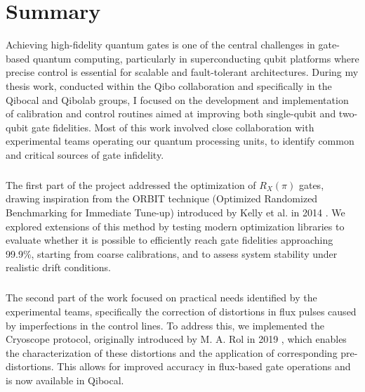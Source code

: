 \chapter*{Summary}

Achieving high-fidelity quantum gates is one of the central challenges in gate-based quantum computing, particularly in superconducting qubit platforms where precise control is essential for scalable and fault-tolerant architectures. 
During my thesis work, conducted within the Qibo collaboration and specifically in the Qibocal and Qibolab groups, I focused on the development and implementation of calibration and control routines aimed at improving both single-qubit and two-qubit gate fidelities.
Most of this work involved close collaboration with experimental teams operating our quantum processing units, to identify common and critical sources of gate infidelity. 

\paragraph{}

\paragraph{}

\paragraph{}
The first part of the project addressed the optimization of $R_X(\pi)$ gates, drawing inspiration from the ORBIT technique (Optimized Randomized Benchmarking for Immediate Tune-up) introduced by Kelly et al. in 2014 \cite{kelly_optimal_2014}. 
We explored extensions of this method by testing modern optimization libraries to evaluate whether it is possible to efficiently reach gate fidelities approaching 99.9\%, starting from coarse calibrations, and to assess system stability under realistic drift conditions.

\paragraph{}
The second part of the work focused on practical needs identified by the experimental teams, specifically the correction of distortions in flux pulses caused by imperfections in the control lines. 
To address this, we implemented the Cryoscope protocol, originally introduced by M. A. Rol in 2019 \cite{rol_time-domain_2020}, which enables the characterization of these distortions and the application of corresponding pre-distortions. This allows for improved accuracy in flux-based gate operations and is now available in Qibocal.

